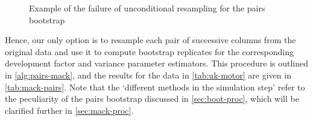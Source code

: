 \documentclass[a4paper]{book}
\begin{document}
\begin{figure}[!htb]
  \centering
  \caption{Example of the failure of unconditional resampling for the pairs bootstrap}
  \label{fig:uncond-pairs-resample}
\end{figure}

Hence, our only option is to resample each pair of successive columns from the original data and use it to compute bootstrap replicates for the corresponding development factor and variance parameter estimators. This procedure is outlined in \cref{alg:pairs-mack}, and the results for the data in \cref{tab:uk-motor} are given in \cref{tab:mack-pairs}. Note that the `different methods in the simulation step' refer to the peculiarity of the pairs bootstrap discussed in \cref{sec:boot-proc}, which will be clarified further in \cref{sec:mack-proc}.
\end{document}
